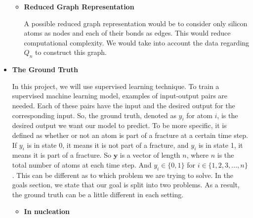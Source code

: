 \begin{itemize}
\begin{itemize}
    
\item \textbf{Reduced Graph Representation} 

A possible reduced graph representation would be to consider only silicon atoms as nodes and each of their bonds as edges. This would reduce computational complexity. We would take into account the data regarding $Q_n$ to construct this graph.
    
\end{itemize}


\item \textbf{The Ground Truth}

In this project, we will use supervised learning technique. To train a supervised machine learning model, examples of input-output pairs are needed. Each of these pairs have the input and the desired output for the corresponding input. So, the ground truth, denoted as $y_i$ for atom $i$, is the desired output we want our model to predict. To be more specific, it is defined as whether or not an atom is part of a fracture at a certain time step. If $y_i$ is in state 0, it means it is not part of a fracture, and $y_i$ is in state 1, it means it is part of a fracture. So $\mathbf{y}$ is a vector of length $n$, where $n$ is the total number of atoms at each time step. And $y_i\in\{0,1\}$ for $i\in\{1,2,3,...,n\}$. This can be different as to which problem we are trying to solve. In the goals section, we state that our goal is split into two problems. As a result, the ground truth can be a little different in each setting.

\begin{itemize}
    \item \textbf{In nucleation}
    

\end{itemize}
\end{itemize}
